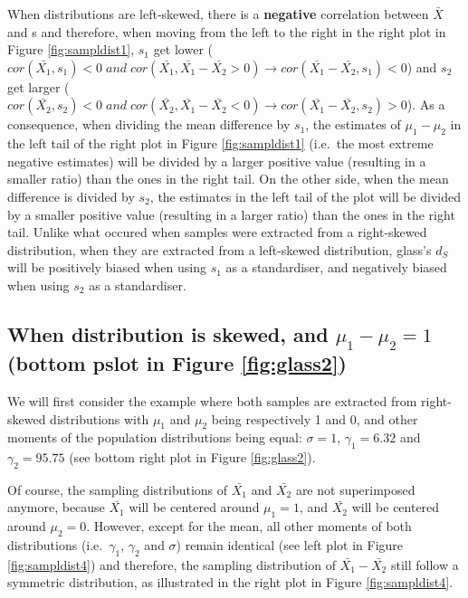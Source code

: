 \documentclass[
  man,floatsintext]{apa6}
\begin{document}
When distributions are left-skewed, there is a \textbf{negative} correlation between \(\bar{X}\) and s and therefore, when moving from the left to the right in the right plot in Figure \ref{fig:sampldist1}, \(s_1\) get lower (\(cor(\bar{X_1},s_1) < 0 \; and \; cor(\bar{X_1},\bar{X_1}-\bar{X_2}>0) \rightarrow cor(\bar{X_1}-\bar{X_2},s_1)<0\)) and \(s_2\) get larger (\(cor(\bar{X_2},s_2) < 0 \; and \; cor(\bar{X_2},\bar{X_1}-\bar{X_2}<0) \rightarrow cor(\bar{X_1}-\bar{X_2},s_2)>0\)). As a consequence, when dividing the mean difference by \(s_1\), the estimates of \(\mu_1-\mu_2\) in the left tail of the right plot in Figure \ref{fig:sampldist1} (i.e.~the most extreme negative estimates) will be divided by a larger positive value (resulting in a smaller ratio) than the ones in the right tail. On the other side, when the mean difference is divided by \(s_2\), the estimates in the left tail of the plot will be divided by a smaller positive value (resulting in a larger ratio) than the ones in the right tail. Unlike what occured when samples were extracted from a right-skewed distribution, when they are extracted from a left-skewed distribution, glass's \(d_S\) will be positively biased when using \(s_1\) as a standardiser, and negatively biased when using \(s_2\) as a standardiser.

\hypertarget{when-distribution-is-skewed-and-mu_1-mu_21-bottom-pslot-in-figure}{%
\subsection{\texorpdfstring{When distribution is skewed, and \textbf{\(\mu_1-\mu_2=1\)} (bottom pslot in Figure \ref{fig:glass2})}{When distribution is skewed, and \textbackslash mu\_1-\textbackslash mu\_2=1 (bottom pslot in Figure )}}\label{when-distribution-is-skewed-and-mu_1-mu_21-bottom-pslot-in-figure}}

We will first consider the example where both samples are extracted from right-skewed distributions with \(\mu_1\) and \(\mu_2\) being respectively 1 and 0, and other moments of the population distributions being equal: \(\sigma=1\), \(\gamma_1=6.32\) and \(\gamma_2=95.75\) (see bottom right plot in Figure \ref{fig:glass2}).

Of course, the sampling distributions of \(\bar{X_1}\) and \(\bar{X_2}\) are not superimposed anymore, because \(\bar{X_1}\) will be centered around \(\mu_1=1\), and \(\bar{X_2}\) will be centered around \(\mu_2=0\). However, except for the mean, all other moments of both distributions (i.e.~\(\gamma_1\), \(\gamma_2\) and \(\sigma\)) remain identical (see left plot in Figure \ref{fig:sampldist4}) and therefore, the sampling distribution of \(\bar{X_1}-\bar{X_2}\) still follow a symmetric distribution, as illustrated in the right plot in Figure \ref{fig:sampldist4}.
\end{document}
